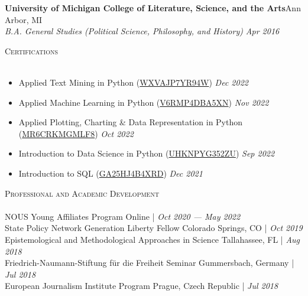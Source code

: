 \documentclass[a4paper,11pt]{article}
\newcommand{\lineunder} {
    \vspace*{-8pt} \\
    \hspace*{-18pt} \hrulefill \\
}
\newcommand{\header} [1] {
    {\hspace*{-18pt}\vspace*{6pt} \textsc{\large{#1}}}
    \vspace*{-6pt} \lineunder
}
\begin{document}
\textbf{University of Michigan College of Literature, Science, and the Arts}\hfill \faMapMarker\space Ann Arbor, MI\\
\textit{B.A. General Studies (Political Science, Philosophy, and History)} \hfill  \emph{Apr 2016}\\

\vspace{1mm}
\header{Certifications}
\begin{itemize}
    \item Applied Text Mining in Python (\href{https://www.coursera.org/account/accomplishments/verify/WXVAJP7YR94W}{WXVAJP7YR94W}) \hfill  \emph{Dec 2022}
    \item Applied Machine Learning in Python (\href{https://www.coursera.org/account/accomplishments/verify/V6RMP4DBA5XN}{V6RMP4DBA5XN}) \hfill  \emph{Nov 2022}
    \item Applied Plotting, Charting \& Data Representation in Python (\href{https://www.coursera.org/account/accomplishments/verify/MR6CRKMGMLF8}{MR6CRKMGMLF8}) \hfill
    \emph{Oct 2022}
    \item Introduction to Data Science in Python (\href{https://www.coursera.org/account/accomplishments/verify/UHKNPYG352ZU}{UHKNPYG352ZU}) \hfill  \emph{Sep 2022}
    \item Introduction to SQL (\href{https://www.coursera.org/account/accomplishments/verify/GA25HJ4B4XRD}{GA25HJ4B4XRD}) \hfill  \emph{Dec 2021}
\end{itemize}
\vspace{1mm}
\header{Professional and Academic Development}

NOUS Young Affiliates Program \hfill \faMapMarker\space Online |  \emph{Oct 2020 --- May 2022} \\

State Policy Network Generation Liberty Fellow \hfill \faMapMarker\space Colorado Springs, CO |  \emph{Oct 2019} \\

Epistemological and Methodological Approaches in Science \hfill \faMapMarker\space Tallahassee, FL |  \emph{Aug 2018} \\

Friedrich-Naumann-Stiftung f\"{u}r die Freiheit Seminar \hfill \faMapMarker\space Gummersbach, Germany |  \emph{Jul 2018} \\

European Journalism Institute Program \hfill \faMapMarker\space Prague, Czech Republic |  \emph{Jul 2018} \\
\end{document}
